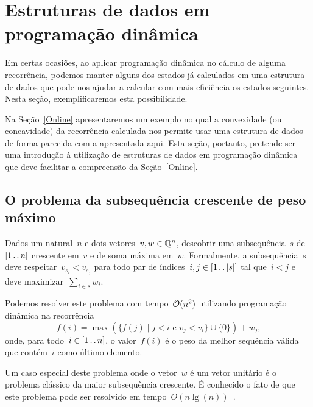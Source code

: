 \section{Estruturas de dados em programação dinâmica}
\label{EDPD}

Em certas ocasiões, ao aplicar programação dinâmica no cálculo de alguma recorrência, podemos manter alguns dos estados já calculados em uma estrutura de dados que pode nos ajudar a calcular com mais eficiência os estados seguintes. Nesta seção, exemplificaremos esta possibilidade. 

Na Seção~\ref{Online} apresentaremos um exemplo no qual a convexidade (ou concavidade) da recorrência calculada nos permite usar uma estrutura de dados de forma parecida com a apresentada aqui. Esta seção, portanto, pretende ser uma introdução à utilização de estruturas de dados em programação dinâmica que deve facilitar a compreensão da Seção~\ref{Online}.


\subsection{O problema da subsequência crescente de peso máximo}

\begin{prob} \label{EDPD:HIS}
Dados um natural~$n$ e dois vetores~$v,w \in \mathbb{Q}^n$, descobrir uma subsequência~$s$ de~$[1 \,.\,.\, n]$ crescente em~$v$ e de soma máxima em~$w$. Formalmente, a subsequência~$s$ deve respeitar~${ v_{s_i} < v_{s_j} }$ para todo par de índices~${ i,j \in [1 \,.\,.\, |s|] }$ tal que~${ i < j }$ e deve maximizar~${ \sum\limits_{i \in s} w_i }$.
\end{prob}

Podemos resolver este problema com tempo~$\mathcal{O}(n^2)$ utilizando programação dinâmica na recorrência
\begin{equation} \label{EDPD:HIS:rec}
f(i) = \max(\{f(j) \mid j < i \text{ e } v_j < v_i\} \cup \{0\}) + w_j \text{,}
\end{equation}
onde, para todo~$i \in [1 \,.\,.\, n]$, o valor~$f(i)$ é o peso da melhor sequência válida que contém~$i$ como último elemento.

Um caso especial deste problema onde o vetor~$w$ é um vetor unitário é o problema clássico da maior subsequência crescente. É conhecido o fato de que este problema pode ser resolvido em tempo~$O(n\lg(n))$~\cite{Fredman:1975}. 

